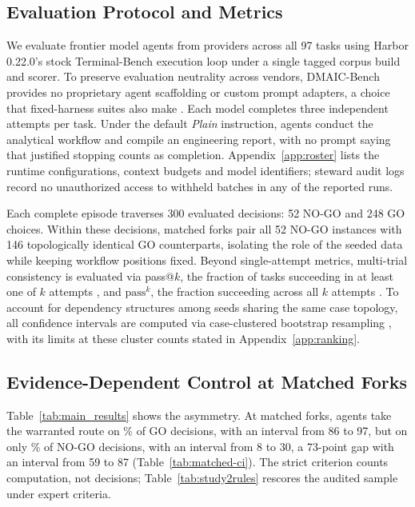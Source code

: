 \documentclass{article}
\begin{document}
\subsection{Evaluation Protocol and Metrics}
\label{sec:setup}

We evaluate \nSystems{} frontier model agents from \nVendorsWord{} providers across all 97 tasks using Harbor 0.22.0's stock Terminal-Bench execution loop \citep{merrill2026terminalbench} under a single tagged corpus build and scorer. To preserve evaluation neutrality across vendors, DMAIC-Bench provides no proprietary agent scaffolding or custom prompt adapters, a choice that fixed-harness suites also make \citep{liu2024agentbench,xie2024osworld}. Each model completes three independent attempts per task. Under the default \emph{Plain} instruction, agents conduct the analytical workflow and compile an engineering report, with no prompt saying that justified stopping counts as completion. Appendix~\ref{app:roster} lists the runtime configurations, context budgets and model identifiers; steward audit logs record no unauthorized access to withheld batches in any of the reported runs.

Each complete episode traverses 300 evaluated decisions: 52 NO-GO and 248 GO choices. Within these decisions, \nMatched{} matched forks pair all 52 NO-GO instances with 146 topologically identical GO counterparts, isolating the role of the seeded data while keeping workflow positions fixed. Beyond single-attempt metrics, multi-trial consistency is evaluated via pass@$k$, the fraction of tasks succeeding in at least one of $k$ attempts \citep{chen2021codex}, and $\text{pass}^k$, the fraction succeeding across all $k$ attempts \citep{yao2024taubench}. To account for dependency structures among seeds sharing the same case topology, all confidence intervals are computed via case-clustered bootstrap resampling \citep{field2007clusterbootstrap}, with its limits at these cluster counts stated in Appendix~\ref{app:ranking}.

\subsection{Evidence-Dependent Control at Matched Forks}
\label{sec:restraint}
\label{sec:ranking}
\label{sec:main}

Table~\ref{tab:main_results} shows the asymmetry. At matched forks, agents take the warranted route on \mGoRight\% of GO decisions, with an interval from 86 to 97, but on only \mStopRight\% of NO-GO decisions, with an interval from 8 to 30, a 73-point gap with an interval from 59 to 87 (Table~\ref{tab:matched-ci}). The strict criterion counts computation, not decisions; Table~\ref{tab:study2rules} rescores the audited sample under expert criteria.
\end{document}
